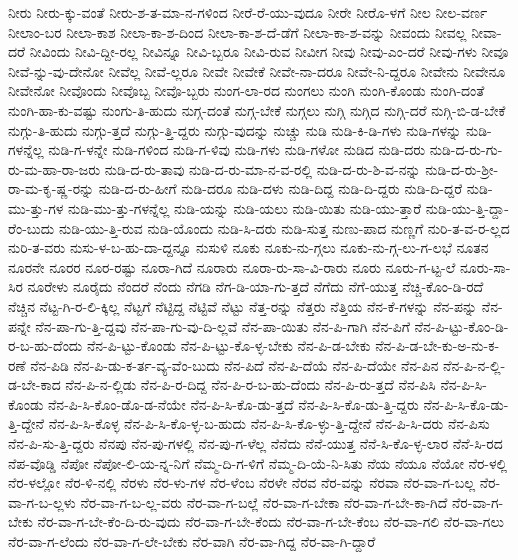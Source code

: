 {ನೀರು
ನೀರು-ಕ್ಕು-ವಂತೆ
ನೀರು-ಶ-ತ-ಮಾ-ನ-ಗಳಿಂದ
ನೀರೆ-ರೆ-ಯು-ವುದೂ
ನೀರೇ
ನೀರೊ-ಳಗೆ
ನೀಲ
ನೀಲ-ವರ್ಣ
ನೀಲಾಂ-ಬರ
ನೀಲಾ-ಕಾಶ
ನೀಲಾ-ಕಾ-ಶ-ದಿಂದ
ನೀಲಾ-ಕಾ-ಶ-ದೆ-ಡೆಗೆ
ನೀಲಾ-ಕಾ-ಶ-ವನ್ನು
ನೀವಂದು
ನೀವಲ್ಲ
ನೀವಾ-ದರೆ
ನೀವಿಂದು
ನೀವಿ-ದ್ದೀ-ರಲ್ಲ
ನೀವಿನ್ನೂ
ನೀವಿ-ಬ್ಬರೂ
ನೀವಿ-ರುವ
ನೀವೀಗ
ನೀವು
ನೀವು-ಎಂ-ದರೆ
ನೀವು-ಗಳು
ನೀವೂ
ನೀವೆ-ನ್ನು-ವು-ದೇನೋ
ನೀವೆಲ್ಲ
ನೀವೆ-ಲ್ಲರೂ
ನೀವೇ
ನೀವೇಕೆ
ನೀವೇ-ನಾ-ದರೂ
ನೀವೇ-ನಿ-ದ್ದರೂ
ನೀವೇನು
ನೀವೇನೂ
ನೀವೇನೋ
ನೀವೊಂದು
ನೀವೊಬ್ಬ
ನೀವೊ-ಬ್ಬರು
ನುಂಗ-ಲಾ-ರದ
ನುಂಗಲು
ನುಂಗಿ
ನುಂಗಿ-ಕೊಂಡು
ನುಂಗಿ-ದಂತೆ
ನುಂಗಿ-ಹಾ-ಕು-ವಷ್ಟು
ನುಂಗು-ತಿ-ಹುದು
ನುಗ್ಗ-ದಂತೆ
ನುಗ್ಗ-ಬೇಕೆ
ನುಗ್ಗಲು
ನುಗ್ಗಿ
ನುಗ್ಗಿದ
ನುಗ್ಗಿ-ದರೆ
ನುಗ್ಗಿ-ಬಿ-ಡ-ಬೇಕೆ
ನುಗ್ಗು-ತಿ-ಹುದು
ನುಗ್ಗು-ತ್ತದೆ
ನುಗ್ಗು-ತ್ತಿ-ದ್ದರು
ನುಗ್ಗು-ವುದನ್ನು
ನುಚ್ಚು
ನುಡಿ
ನುಡಿ-ಕಿ-ಡಿ-ಗಳು
ನುಡಿ-ಗಳನ್ನು
ನುಡಿ-ಗಳನ್ನೆಲ್ಲ
ನುಡಿ-ಗ-ಳನ್ನೇ
ನುಡಿ-ಗಳಿಂದ
ನುಡಿ-ಗ-ಳಿವು
ನುಡಿ-ಗಳು
ನುಡಿ-ಗಳೋ
ನುಡಿದ
ನುಡಿ-ದರು
ನುಡಿ-ದ-ರು-ಗು-ರು-ಮ-ಹಾ-ರಾ-ಜರು
ನುಡಿ-ದ-ರು-ತಾವು
ನುಡಿ-ದ-ರು-ಮಾ-ನ-ವ-ರಲ್ಲಿ
ನುಡಿ-ದ-ರು-ಶಿ-ವ-ನನ್ನು
ನುಡಿ-ದ-ರು-ಶ್ರೀ-ರಾ-ಮ-ಕೃ-ಷ್ಣ-ರನ್ನು
ನುಡಿ-ದ-ರು-ಹೀಗೆ
ನುಡಿ-ದರೂ
ನುಡಿ-ದಳು
ನುಡಿ-ದಿದ್ದ
ನುಡಿ-ದಿ-ದ್ದರು
ನುಡಿ-ದಿ-ದ್ದರೆ
ನುಡಿ-ಮು-ತ್ತು-ಗಳ
ನುಡಿ-ಮು-ತ್ತು-ಗಳನ್ನೆಲ್ಲ
ನುಡಿ-ಯನ್ನು
ನುಡಿ-ಯಲು
ನುಡಿ-ಯಿತು
ನುಡಿ-ಯು-ತ್ತಾರೆ
ನುಡಿ-ಯು-ತ್ತಿ-ದ್ದಾ-ರೆಂ-ಬುದು
ನುಡಿ-ಯು-ತ್ತಿ-ರುವ
ನುಡಿ-ಯೊಂದು
ನುಡಿ-ಸಿ-ದರು
ನುಡಿ-ಸುತ್ತ
ನುಣು-ಪಾದ
ನುಣ್ಣಗೆ
ನುರಿ-ತ-ವ-ರ-ಲ್ಲದ
ನುರಿ-ತ-ವರು
ನುಸು-ಳ-ಬ-ಹು-ದಾ-ದ್ದನ್ನೂ
ನುಸುಳಿ
ನೂಕು
ನೂಕು-ನು-ಗ್ಗಲು
ನೂಕು-ನು-ಗ್ಗ-ಲು-ಗ-ಲಭೆ
ನೂತನ
ನೂರನೇ
ನೂರರ
ನೂರ-ರಷ್ಟು
ನೂರಾ-ಗಿದೆ
ನೂರಾರು
ನೂರಾ-ರು-ಸಾ-ವಿ-ರಾರು
ನೂರು
ನೂರು-ಗ-ಟ್ಟ-ಲೆ
ನೂರು-ಸಾ-ಸಿರ
ನೂರೇಳು
ನೂರೈದು
ನೆಂದರೆ
ನೆಂದು
ನೆಗಡಿ
ನೆಗ-ಡಿ-ಯಾ-ಗು-ತ್ತದೆ
ನೆಗೆದು
ನೆಗೆ-ಯುತ್ತ
ನೆಚ್ಚಿ-ಕೊಂ-ಡಿ-ರದೆ
ನೆಚ್ಚಿನ
ನೆಟ್ಟ-ಗಿ-ರ-ಲಿ-ಕ್ಕಿಲ್ಲ
ನೆಟ್ಟಗೆ
ನೆಟ್ಟಿದ್ದ
ನೆಟ್ಟಿವೆ
ನೆಟ್ಟು
ನೆತ್ತ-ರನ್ನು
ನೆತ್ತರು
ನೆತ್ತಿಯ
ನೆನ-ಕೆ-ಗಳನ್ನು
ನೆನ-ಪನ್ನು
ನೆನ-ಪನ್ನೇ
ನೆನ-ಪಾ-ಗು-ತ್ತಿ-ದ್ದವು
ನೆನ-ಪಾ-ಗು-ವು-ದಿ-ಲ್ಲವೆ
ನೆನ-ಪಾ-ಯಿತು
ನೆನ-ಪಿ-ಗಾಗಿ
ನೆನ-ಪಿಗೆ
ನೆನ-ಪಿ-ಟ್ಟು-ಕೊಂ-ಡಿ-ರ-ಬ-ಹು-ದೆಂದು
ನೆನ-ಪಿ-ಟ್ಟು-ಕೊಂಡು
ನೆನ-ಪಿ-ಟ್ಟು-ಕೊ-ಳ್ಳ-ಬೇಕು
ನೆನ-ಪಿ-ಡ-ಬೇಕು
ನೆನ-ಪಿ-ಡ-ಬೇ-ಕು-ಅ-ನು-ಕ-ರಣೆ
ನೆನ-ಪಿಡಿ
ನೆನ-ಪಿ-ಡು-ಕ-ರ್ತ-ವ್ಯ-ವೆಂ-ಬುದು
ನೆನ-ಪಿದೆ
ನೆನ-ಪಿ-ದೆಯೆ
ನೆನ-ಪಿ-ದೆಯೇ
ನೆನ-ಪಿನ
ನೆನ-ಪಿ-ನ-ಲ್ಲಿ-ಡ-ಬೇ-ಕಾದ
ನೆನ-ಪಿ-ನ-ಲ್ಲಿಡು
ನೆನ-ಪಿ-ರ-ದಿದ್ದ
ನೆನ-ಪಿ-ರ-ಬ-ಹು-ದೆಂದು
ನೆನ-ಪಿ-ರು-ತ್ತದೆ
ನೆನ-ಪಿಸಿ
ನೆನ-ಪಿ-ಸಿ-ಕೊಂಡು
ನೆನ-ಪಿ-ಸಿ-ಕೊಂ-ಡೊ-ಡ-ನೆಯೇ
ನೆನ-ಪಿ-ಸಿ-ಕೊ-ಡು-ತ್ತದೆ
ನೆನ-ಪಿ-ಸಿ-ಕೊ-ಡು-ತ್ತಿ-ದ್ದರು
ನೆನ-ಪಿ-ಸಿ-ಕೊ-ಡು-ತ್ತಿ-ದ್ದೇನೆ
ನೆನ-ಪಿ-ಸಿ-ಕೊಳ್ಳ
ನೆನ-ಪಿ-ಸಿ-ಕೊ-ಳ್ಳ-ಬ-ಹುದು
ನೆನ-ಪಿ-ಸಿ-ಕೊ-ಳ್ಳು-ತ್ತಿ-ದ್ದೇನೆ
ನೆನ-ಪಿ-ಸಿ-ದರು
ನೆನ-ಪಿಸು
ನೆನ-ಪಿ-ಸು-ತ್ತಿ-ದ್ದರು
ನೆನಪು
ನೆನ-ಪು-ಗಳಲ್ಲಿ
ನೆನ-ಪು-ಗ-ಳೆಲ್ಲ
ನೆನೆದು
ನೆನೆ-ಯುತ್ತ
ನೆನೆ-ಸಿ-ಕೊ-ಳ್ಳ-ಲಾರ
ನೆನೆ-ಸಿ-ರದ
ನೆಪ-ವೊಡ್ಡಿ
ನೆಪೋ
ನೆಪೋ-ಲಿ-ಯ-ನ್ನ-ನಿಗೆ
ನೆಮ್ಮ-ದಿ-ಗ-ಳಿಗೆ
ನೆಮ್ಮ-ದಿ-ಯೆ-ನಿ-ಸಿತು
ನೆಯ
ನೆಯೂ
ನೆಯೋ
ನೆರ-ಳಲ್ಲಿ
ನೆರ-ಳಲ್ಲೋ
ನೆರ-ಳಿ-ನಲ್ಲಿ
ನೆರಳು
ನೆರ-ಳು-ಗಳ
ನೆರ-ಳೆಂಬ
ನೆರಳೇ
ನೆರವ
ನೆರ-ವನ್ನು
ನೆರವಾ
ನೆರ-ವಾ-ಗ-ಬಲ್ಲ
ನೆರ-ವಾ-ಗ-ಬ-ಲ್ಲಳು
ನೆರ-ವಾ-ಗ-ಬ-ಲ್ಲ-ವರು
ನೆರ-ವಾ-ಗ-ಬಲ್ಲೆ
ನೆರ-ವಾ-ಗ-ಬೇಕಾ
ನೆರ-ವಾ-ಗ-ಬೇ-ಕಾ-ಗಿದೆ
ನೆರ-ವಾ-ಗ-ಬೇಕು
ನೆರ-ವಾ-ಗ-ಬೇ-ಕೆಂ-ದಿ-ರು-ವುದು
ನೆರ-ವಾ-ಗ-ಬೇ-ಕೆಂದು
ನೆರ-ವಾ-ಗ-ಬೇ-ಕೆಂಬ
ನೆರ-ವಾ-ಗಲಿ
ನೆರ-ವಾ-ಗಲು
ನೆರ-ವಾ-ಗ-ಲೆಂದು
ನೆರ-ವಾ-ಗ-ಲೇ-ಬೇಕು
ನೆರ-ವಾಗಿ
ನೆರ-ವಾ-ಗಿದ್ದ
ನೆರ-ವಾ-ಗಿ-ದ್ದಾರೆ
}
